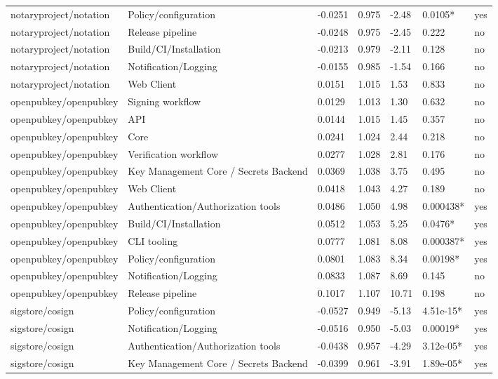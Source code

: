 \begin{table}[t]
\begin{tabular}{lllllll}
notaryproject/notation & Policy/configuration & -0.0251 & 0.975 & -2.48 & 0.0105* & yes \\
notaryproject/notation & Release pipeline & -0.0248 & 0.975 & -2.45 & 0.222 & no \\
notaryproject/notation & Build/CI/Installation & -0.0213 & 0.979 & -2.11 & 0.128 & no \\
notaryproject/notation & Notification/Logging & -0.0155 & 0.985 & -1.54 & 0.166 & no \\
notaryproject/notation & Web Client & 0.0151 & 1.015 & 1.53 & 0.833 & no \\
openpubkey/openpubkey & Signing workflow & 0.0129 & 1.013 & 1.30 & 0.632 & no \\
openpubkey/openpubkey & API & 0.0144 & 1.015 & 1.45 & 0.357 & no \\
openpubkey/openpubkey & Core & 0.0241 & 1.024 & 2.44 & 0.218 & no \\
openpubkey/openpubkey & Verification workflow & 0.0277 & 1.028 & 2.81 & 0.176 & no \\
openpubkey/openpubkey & Key Management Core / Secrets Backend & 0.0369 & 1.038 & 3.75 & 0.495 & no \\
openpubkey/openpubkey & Web Client & 0.0418 & 1.043 & 4.27 & 0.189 & no \\
openpubkey/openpubkey & Authentication/Authorization tools & 0.0486 & 1.050 & 4.98 & 0.000438* & yes \\
openpubkey/openpubkey & Build/CI/Installation & 0.0512 & 1.053 & 5.25 & 0.0476* & yes \\
openpubkey/openpubkey & CLI tooling & 0.0777 & 1.081 & 8.08 & 0.000387* & yes \\
openpubkey/openpubkey & Policy/configuration & 0.0801 & 1.083 & 8.34 & 0.00198* & yes \\
openpubkey/openpubkey & Notification/Logging & 0.0833 & 1.087 & 8.69 & 0.145 & no \\
openpubkey/openpubkey & Release pipeline & 0.1017 & 1.107 & 10.71 & 0.198 & no \\
sigstore/cosign & Policy/configuration & -0.0527 & 0.949 & -5.13 & 4.51e-15* & yes \\
sigstore/cosign & Notification/Logging & -0.0516 & 0.950 & -5.03 & 0.00019* & yes \\
sigstore/cosign & Authentication/Authorization tools & -0.0438 & 0.957 & -4.29 & 3.12e-05* & yes \\
sigstore/cosign & Key Management Core / Secrets Backend & -0.0399 & 0.961 & -3.91 & 1.89e-05* & yes \\

\end{tabular}
\end{table}
